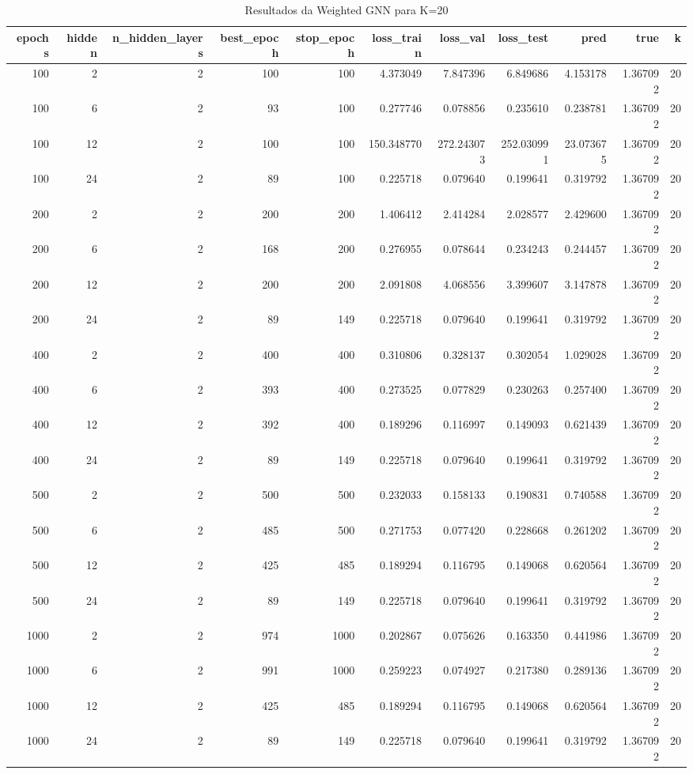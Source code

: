 \begin{table}
\caption{Resultados da Weighted GNN para K=20}
\label{tab:weighted_gnn_results_k20}
\begin{tabular}{rrrrrrrrrrr}
\toprule
epochs & hidden & n\_hidden\_layers & best\_epoch & stop\_epoch & loss\_train & loss\_val & loss\_test & pred & true & k \\
\midrule
100 & 2 & 2 & 100 & 100 & 4.373049 & 7.847396 & 6.849686 & 4.153178 & 1.367092 & 20 \\
100 & 6 & 2 & 93 & 100 & 0.277746 & 0.078856 & 0.235610 & 0.238781 & 1.367092 & 20 \\
100 & 12 & 2 & 100 & 100 & 150.348770 & 272.243073 & 252.030991 & 23.073675 & 1.367092 & 20 \\
100 & 24 & 2 & 89 & 100 & 0.225718 & 0.079640 & 0.199641 & 0.319792 & 1.367092 & 20 \\
200 & 2 & 2 & 200 & 200 & 1.406412 & 2.414284 & 2.028577 & 2.429600 & 1.367092 & 20 \\
200 & 6 & 2 & 168 & 200 & 0.276955 & 0.078644 & 0.234243 & 0.244457 & 1.367092 & 20 \\
200 & 12 & 2 & 200 & 200 & 2.091808 & 4.068556 & 3.399607 & 3.147878 & 1.367092 & 20 \\
200 & 24 & 2 & 89 & 149 & 0.225718 & 0.079640 & 0.199641 & 0.319792 & 1.367092 & 20 \\
400 & 2 & 2 & 400 & 400 & 0.310806 & 0.328137 & 0.302054 & 1.029028 & 1.367092 & 20 \\
400 & 6 & 2 & 393 & 400 & 0.273525 & 0.077829 & 0.230263 & 0.257400 & 1.367092 & 20 \\
400 & 12 & 2 & 392 & 400 & 0.189296 & 0.116997 & 0.149093 & 0.621439 & 1.367092 & 20 \\
400 & 24 & 2 & 89 & 149 & 0.225718 & 0.079640 & 0.199641 & 0.319792 & 1.367092 & 20 \\
500 & 2 & 2 & 500 & 500 & 0.232033 & 0.158133 & 0.190831 & 0.740588 & 1.367092 & 20 \\
500 & 6 & 2 & 485 & 500 & 0.271753 & 0.077420 & 0.228668 & 0.261202 & 1.367092 & 20 \\
500 & 12 & 2 & 425 & 485 & 0.189294 & 0.116795 & 0.149068 & 0.620564 & 1.367092 & 20 \\
500 & 24 & 2 & 89 & 149 & 0.225718 & 0.079640 & 0.199641 & 0.319792 & 1.367092 & 20 \\
1000 & 2 & 2 & 974 & 1000 & 0.202867 & 0.075626 & 0.163350 & 0.441986 & 1.367092 & 20 \\
1000 & 6 & 2 & 991 & 1000 & 0.259223 & 0.074927 & 0.217380 & 0.289136 & 1.367092 & 20 \\
1000 & 12 & 2 & 425 & 485 & 0.189294 & 0.116795 & 0.149068 & 0.620564 & 1.367092 & 20 \\
1000 & 24 & 2 & 89 & 149 & 0.225718 & 0.079640 & 0.199641 & 0.319792 & 1.367092 & 20 \\
\bottomrule
\end{tabular}
\end{table}
